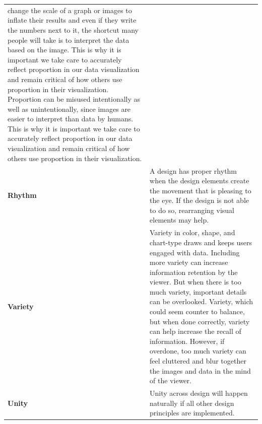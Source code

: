 \documentclass[]{book}
\begin{document}
\begin{longtable}[]{@{}ll@{}}
\begin{minipage}[t]{0.78\columnwidth}
change the scale of a graph or images to inflate their results and even
if they write the numbers next to it, the shortcut many people will take
is to interpret the data based on the image. This is why it is important
we take care to accurately reflect proportion in our data visualization
and remain critical of how others use proportion in their visualization.
Proportion can be misused intentionally as well as unintentionally,
since images are easier to interpret than data by humans. This is why it
is important we take care to accurately reflect proportion in our data
visualization and remain critical of how others use proportion in their
visualization.\strut
\end{minipage}\tabularnewline
\begin{minipage}[t]{0.16\columnwidth}\raggedright\strut
\textbf{Rhythm}\strut
\end{minipage} & \begin{minipage}[t]{0.78\columnwidth}\raggedright\strut
A design has proper rhythm when the design elements create the movement
that is pleasing to the eye. If the design is not able to do so,
rearranging visual elements may help.\strut
\end{minipage}\tabularnewline
\begin{minipage}[t]{0.16\columnwidth}\raggedright\strut
\textbf{Variety}\strut
\end{minipage} & \begin{minipage}[t]{0.78\columnwidth}\raggedright\strut
Variety in color, shape, and chart-type draws and keeps users engaged
with data. Including more variety can increase information retention by
the viewer. But when there is too much variety, important details can be
overlooked. Variety, which could seem counter to balance, but when done
correctly, variety can help increase the recall of information. However,
if overdone, too much variety can feel cluttered and blur together the
images and data in the mind of the viewer.\strut
\end{minipage}\tabularnewline
\begin{minipage}[t]{0.16\columnwidth}\raggedright\strut
\textbf{Unity}\strut
\end{minipage} & \begin{minipage}[t]{0.78\columnwidth}\raggedright\strut
Unity across design will happen naturally if all other design principles
are implemented.\strut
\end{minipage}\tabularnewline
\bottomrule
\end{longtable}
\end{document}
